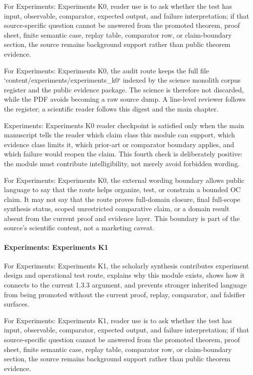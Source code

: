For Experiments: Experiments K0, reader use is to ask whether the test has input, observable, comparator, expected output, and failure interpretation; if that source-specific question cannot be answered from the promoted theorem, proof sheet, finite semantic case, replay table, comparator row, or claim-boundary section, the source remains background support rather than public theorem evidence.


For Experiments: Experiments K0, the audit route keeps the full file `content/experiments/experiments\_k0` indexed by the science monolith corpus register and the public evidence package. The science is therefore not discarded, while the PDF avoids becoming a raw source dump. A line-level reviewer follows the register; a scientific reader follows this digest and the main chapter.


Experiments: Experiments K0 reader checkpoint is satisfied only when the main manuscript tells the reader which claim class this module can support, which evidence class limits it, which prior-art or comparator boundary applies, and which failure would reopen the claim. This fourth check is deliberately positive: the module must contribute intelligibility, not merely avoid forbidden wording.


For Experiments: Experiments K0, the external wording boundary allows public language to say that the route helps organize, test, or constrain a bounded OC claim. It may not say that the route proves full-domain closure, final full-scope synthesis status, scoped unrestricted comparative claim, or a domain result absent from the current proof and evidence layer. This boundary is part of the source's scientific content, not a marketing caveat.


\paragraph{Experiments: Experiments K1}

For Experiments: Experiments K1, the scholarly synthesis contributes experiment design and operational test route, explains why this module exists, shows how it connects to the current 1.3.3 argument, and prevents stronger inherited language from being promoted without the current proof, replay, comparator, and falsifier surfaces.


For Experiments: Experiments K1, reader use is to ask whether the test has input, observable, comparator, expected output, and failure interpretation; if that source-specific question cannot be answered from the promoted theorem, proof sheet, finite semantic case, replay table, comparator row, or claim-boundary section, the source remains background support rather than public theorem evidence.


